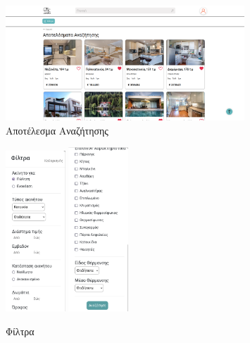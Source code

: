 \documentclass[manuscript,screen,review, language=greek, language=english]{acmart}
\begin{document}
	\begin{figure}[H]
		   \includegraphics[width=0.8\textwidth]{search_page.png}
		   \caption{Αποτέλεσμα Αναζήτησης}
		   \label{fig:search_page}
	\end{figure}
	\begin{figure}[H]
		   \includegraphics[width=0.2\textwidth]{filter1.png}
		   \includegraphics[width=0.2\textwidth]{filter2.png}
		   \caption{Φίλτρα}
		   \label{fig:filters}
	\end{figure}
\end{document}
